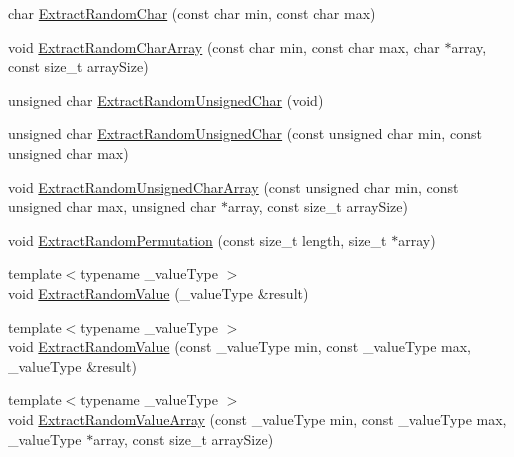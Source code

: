\begin{DoxyCompactItemize}
char \hyperlink{classcmn_random_sequence_a775b56e7925b8261f5704b4b65ef698c}{Extract\-Random\-Char} (const char min, const char max)
\item 
void \hyperlink{classcmn_random_sequence_a1cdb0f1ac5d1e9a9776efbc17c597b99}{Extract\-Random\-Char\-Array} (const char min, const char max, char $\ast$array, const size\-\_\-t array\-Size)
\item 
unsigned char \hyperlink{classcmn_random_sequence_a262f75d0fb6c781bcafff194cc928362}{Extract\-Random\-Unsigned\-Char} (void)
\item 
unsigned char \hyperlink{classcmn_random_sequence_a8d57f970f3e1f418bc24b5f649dd91c3}{Extract\-Random\-Unsigned\-Char} (const unsigned char min, const unsigned char max)
\item 
void \hyperlink{classcmn_random_sequence_a1590899b28b97214e2d366242a4cb49d}{Extract\-Random\-Unsigned\-Char\-Array} (const unsigned char min, const unsigned char max, unsigned char $\ast$array, const size\-\_\-t array\-Size)
\item 
void \hyperlink{classcmn_random_sequence_a4c26cb9a2036319501d9b4b282759945}{Extract\-Random\-Permutation} (const size\-\_\-t length, size\-\_\-t $\ast$array)
\end{DoxyCompactItemize}
{\bf }\par
\begin{DoxyCompactItemize}
\item 
{\footnotesize template$<$typename \-\_\-value\-Type $>$ }\\void \hyperlink{classcmn_random_sequence_a9ceb160824285f8c4ce757f81a96dbc9}{Extract\-Random\-Value} (\-\_\-value\-Type \&result)
\item 
{\footnotesize template$<$typename \-\_\-value\-Type $>$ }\\void \hyperlink{classcmn_random_sequence_a40b78b52ea3b774b081af0cce7db4203}{Extract\-Random\-Value} (const \-\_\-value\-Type min, const \-\_\-value\-Type max, \-\_\-value\-Type \&result)
\item 
{\footnotesize template$<$typename \-\_\-value\-Type $>$ }\\void \hyperlink{classcmn_random_sequence_af235d6abab889eadcbc260ffa9c69169}{Extract\-Random\-Value\-Array} (const \-\_\-value\-Type min, const \-\_\-value\-Type max, \-\_\-value\-Type $\ast$array, const size\-\_\-t array\-Size)
\end{DoxyCompactItemize}

